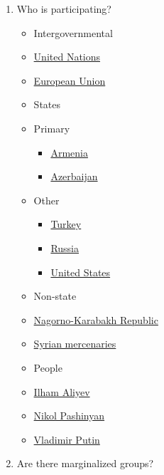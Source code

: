 \documentclass{article}
\begin{document}
\begin{enumerate}
\item
  Who is participating?

  \begin{itemize}
  \item
    Intergovernmental\\
  \item
    \href{https://en.wikipedia.org/wiki/United_Nations}{United
    Nations}\\
  \item
    \href{https://en.wikipedia.org/wiki/European_Union}{European
    Union}\\
  \item
    States\\
  \item
    Primary

    \begin{itemize}
    \itemsep1pt\parskip0pt
    \item
      \href{https://en.wikipedia.org/wiki/Armenia}{Armenia}\\
    \item
      \href{https://en.wikipedia.org/wiki/Azerbaijan}{Azerbaijan}\\
    \end{itemize}
  \item
    Other

    \begin{itemize}
    \itemsep1pt\parskip0pt
    \item
      \href{https://en.wikipedia.org/wiki/Turkey}{Turkey}\\
    \item
      \href{https://en.wikipedia.org/wiki/Russia}{Russia}\\
    \item
      \href{https://en.wikipedia.org/wiki/United_States}{United
      States}\\
    \end{itemize}
  \item
    Non-state\\
  \item
    \href{https://en.wikipedia.org/wiki/Republic_of_Artsakh}{Nagorno-Karabakh
    Republic}\\
  \item
    \href{./Participants/Syrian_mercenaries/}{Syrian mercenaries}\\
  \item
    People\\
  \item
    \href{https://en.wikipedia.org/wiki/Ilham_Aliyev}{Ilham Aliyev}\\
  \item
    \href{https://en.wikipedia.org/wiki/Nikol_Pashinyan}{Nikol
    Pashinyan}\\
  \item
    \href{https://en.wikipedia.org/wiki/Vladimir_Putin}{Vladimir
    Putin}\\
  \end{itemize}
\item
  Are there marginalized groups?


\end{enumerate}
\end{document}
